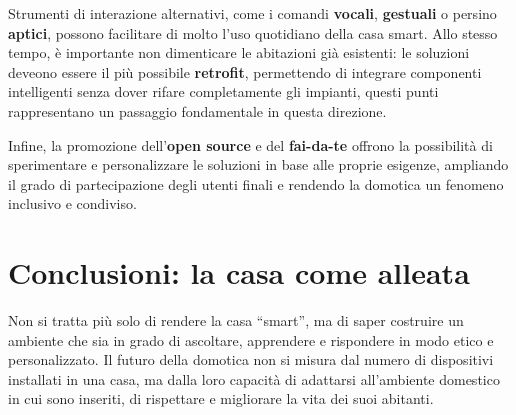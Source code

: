 Strumenti di interazione alternativi, come i comandi \textbf{vocali}, \textbf{gestuali} o persino \textbf{aptici}, possono facilitare di molto l’uso quotidiano della casa smart. Allo stesso tempo, è importante non dimenticare le abitazioni già esistenti: le soluzioni deveono essere il più possibile \textbf{retrofit}, permettendo di integrare componenti intelligenti senza dover rifare completamente gli impianti, questi punti rappresentano un passaggio fondamentale in questa direzione.  

Infine, la promozione dell’\textbf{open source} e del \textbf{fai-da-te} offrono la possibilità di sperimentare e personalizzare le soluzioni in base alle proprie esigenze, ampliando il grado di partecipazione degli utenti finali e rendendo la domotica un fenomeno inclusivo e condiviso.


\section{Conclusioni: la casa come alleata}

Non si tratta più solo di rendere la casa “smart”, ma di saper costruire un ambiente che sia in grado di ascoltare, apprendere e rispondere in modo etico e personalizzato. Il futuro della domotica non si misura dal numero di dispositivi installati in una casa, ma dalla loro capacità di adattarsi all’ambiente domestico in cui sono inseriti, di rispettare e migliorare la vita dei suoi abitanti.

